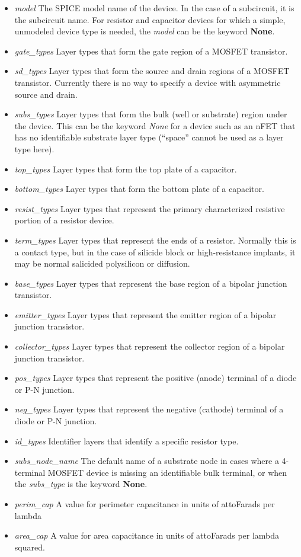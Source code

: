 \documentclass[letterpaper,twoside,12pt]{article}
\begin{document}
\begin{itemize}
   \item {\itshape model} The SPICE model name of the device.  In the case of
	a subcircuit, it is the subcircuit name.  For resistor and capacitor
	devices for which a simple, unmodeled device type is needed, the
	{\itshape model} can be the keyword {\bfseries None}.
   \item {\itshape gate\_types} Layer types that form the gate region of a
	MOSFET transistor.
   \item {\itshape sd\_types} Layer types that form the source and drain
	regions of a MOSFET transistor.  Currently there is no way to specify
	a device with asymmetric source and drain.
   \item {\itshape subs\_types} Layer types that form the bulk (well or
	substrate) region under the device.  This can be the keyword
	{\itshape None} for a device such as an nFET that has no identifiable
	substrate layer type (``space'' cannot be used as a layer type here).
   \item {\itshape top\_types} Layer types that form the top plate of a
	capacitor.
   \item {\itshape bottom\_types} Layer types that form the bottom plate of
	a capacitor.
   \item {\itshape resist\_types} Layer types that represent the primary
	characterized resistive portion of a resistor device.
   \item {\itshape term\_types} Layer types that represent the ends of a
	resistor.  Normally this is a contact type, but in the case of
	silicide block or high-resistance implants, it may be normal salicided
	polysilicon or diffusion.
   \item {\itshape base\_types} Layer types that represent the base region
	of a bipolar junction transistor.
   \item {\itshape emitter\_types} Layer types that represent the emitter
	region of a bipolar junction transistor.
   \item {\itshape collector\_types} Layer types that represent the collector
	region of a bipolar junction transistor.
   \item {\itshape pos\_types} Layer types that represent the positive (anode)
	terminal of a diode or P-N junction.
   \item {\itshape neg\_types} Layer types that represent the negative (cathode)
	terminal of a diode or P-N junction.
   \item {\itshape id\_types} Identifier layers that identify a specific
	resistor type.
   \item {\itshape subs\_node\_name} The default name of a substrate node in
	cases where a 4-terminal MOSFET device is missing an identifiable
	bulk terminal, or when the {\itshape subs\_type} is the keyword
	{\bfseries None}.
   \item {\itshape perim\_cap} A value for perimeter capacitance in units of
	attoFarads per lambda
   \item {\itshape area\_cap} A value for area capacitance in units of
	attoFarads per lambda squared.
\end{itemize}
\end{document}
